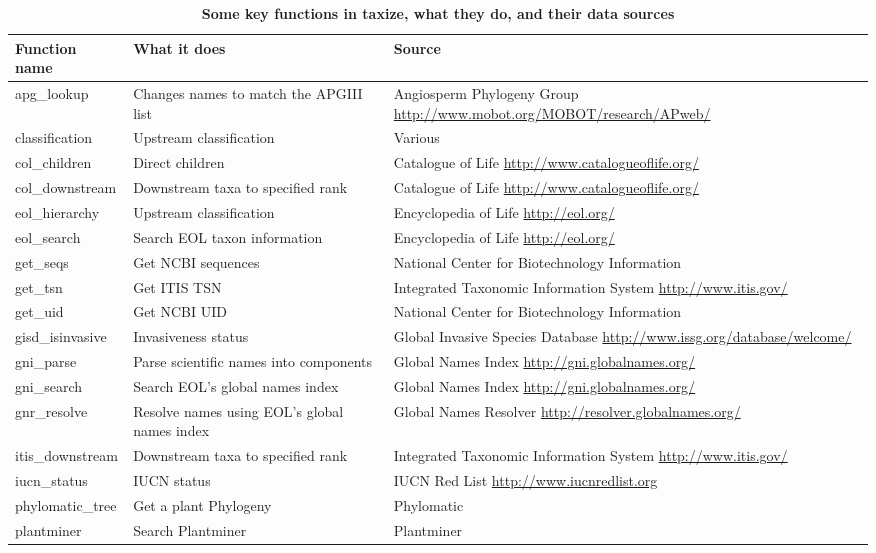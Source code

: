 \documentclass[10pt,a4paper,twocolumn]{article}\usepackage[]{graphicx}\usepackage[]{color}
\begin{document}
\begin{table}[!ht]
\centering
\caption{
\bf{Some key functions in taxize, what they do, and their data sources}}
\begin{tabular}{|l|L|L|}
\hline
Function name & What it does & Source \\
\hline
apg\_lookup & Changes names to match the APGIII list & Angiosperm Phylogeny Group \url{http://www.mobot.org/MOBOT/research/APweb/}  \\
classification & Upstream classification & Various  \\
col\_children & Direct children & Catalogue of Life \url{http://www.catalogueoflife.org/}  \\
col\_downstream & Downstream taxa to specified rank & Catalogue of Life \url{http://www.catalogueoflife.org/}  \\
eol\_hierarchy & Upstream classification & Encyclopedia of Life \url{http://eol.org/}  \\
eol\_search & Search EOL taxon information & Encyclopedia of Life \url{http://eol.org/}  \\
get\_seqs & Get NCBI sequences & National Center for Biotechnology Information \cite{federhen2012}  \\
get\_tsn & Get ITIS TSN & Integrated Taxonomic Information System \url{http://www.itis.gov/}  \\
get\_uid & Get NCBI UID & National Center for Biotechnology Information \cite{federhen2012}  \\
gisd\_isinvasive & Invasiveness status & Global Invasive Species Database \url{http://www.issg.org/database/welcome/}  \\
gni\_parse & Parse scientific names into components & Global Names Index \url{http://gni.globalnames.org/}   \\
gni\_search & Search EOL's global names index & Global Names Index \url{http://gni.globalnames.org/}   \\
gnr\_resolve & Resolve names using EOL's global names index & Global Names Resolver \url{http://resolver.globalnames.org/}  \\
itis\_downstream & Downstream taxa to specified rank & Integrated Taxonomic Information System \url{http://www.itis.gov/}  \\
iucn\_status & IUCN status & IUCN Red List \url{http://www.iucnredlist.org}  \\
phylomatic\_tree & Get a plant Phylogeny & Phylomatic \cite{webb2005}  \\
plantminer & Search Plantminer & Plantminer \cite{carvalho2010plantminer}   \\

\end{tabular}
\end{table}
\end{document}
